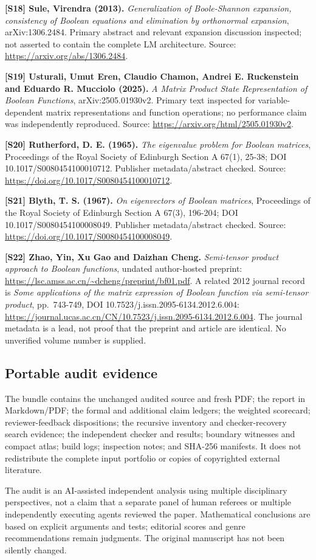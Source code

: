 \documentclass[
  10pt,
]{article}
\begin{document}
\textbf{{[}S18{]} Sule, Virendra (2013).} \emph{Generalization of
Boole-Shannon expansion, consistency of Boolean equations and
elimination by orthonormal expansion}, arXiv:1306.2484. Primary abstract
and relevant expansion discussion inspected; not asserted to contain the
complete LM architecture. Source: \url{https://arxiv.org/abs/1306.2484}.

\textbf{{[}S19{]} Usturali, Umut Eren, Claudio Chamon, Andrei E.
Ruckenstein and Eduardo R. Mucciolo (2025).} \emph{A Matrix Product
State Representation of Boolean Functions}, arXiv:2505.01930v2. Primary
text inspected for variable-dependent matrix representations and
function operations; no performance claim was independently reproduced.
Source: \url{https://arxiv.org/html/2505.01930v2}.

\textbf{{[}S20{]} Rutherford, D. E. (1965).} \emph{The eigenvalue
problem for Boolean matrices}, Proceedings of the Royal Society of
Edinburgh Section A 67(1), 25-38; DOI 10.1017/S0080454100010712.
Publisher metadata/abstract checked. Source:
\url{https://doi.org/10.1017/S0080454100010712}.

\textbf{{[}S21{]} Blyth, T. S. (1967).} \emph{On eigenvectors of Boolean
matrices}, Proceedings of the Royal Society of Edinburgh Section A
67(3), 196-204; DOI 10.1017/S0080454100008049. Publisher
metadata/abstract checked. Source:
\url{https://doi.org/10.1017/S0080454100008049}.

\textbf{{[}S22{]} Zhao, Yin, Xu Gao and Daizhan Cheng.}
\emph{Semi-tensor product approach to Boolean functions}, undated
author-hosted preprint:
\url{https://lsc.amss.ac.cn/~dcheng/preprint/bf01.pdf}. A related 2012
journal record is \emph{Some applications of the matrix expression of
Boolean function via semi-tensor product}, pp.~743-749, DOI
10.7523/j.issn.2095-6134.2012.6.004:
\url{https://journal.ucas.ac.cn/CN/10.7523/j.issn.2095-6134.2012.6.004}.
The journal metadata is a lead, not proof that the preprint and article
are identical. No unverified volume number is supplied.

\subsection{Portable audit evidence}\label{portable-audit-evidence}

The bundle contains the unchanged audited source and fresh PDF; the
report in Markdown/PDF; the formal and additional claim ledgers; the
weighted scorecard; reviewer-feedback dispositions; the recursive
inventory and checker-recovery search evidence; the independent checker
and results; boundary witnesses and compact atlas; build logs;
inspection notes; and SHA-256 manifests. It does not redistribute the
complete input portfolio or copies of copyrighted external literature.

The audit is an AI-assisted independent analysis using multiple
disciplinary perspectives, not a claim that a separate panel of human
referees or multiple independently executing agents reviewed the paper.
Mathematical conclusions are based on explicit arguments and tests;
editorial scores and genre recommendations remain judgments. The
original manuscript has not been silently changed.
\end{document}
